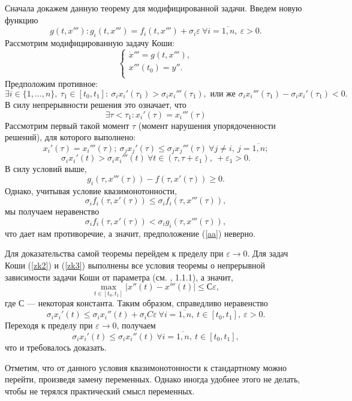 \documentclass{article}
\renewcommand{\le}{\leqslant}
\renewcommand{\ge}{\geqslant}
\newcommand{\abs}[1]{\left\lvert #1 \right\rvert}
\theoremstyle{definition}
\begin{document}
Сначала докажем данную теорему для модифицированной задачи.
Введем новую функцию
\[
g(t, x'''): g_i(t, x''') = f_i(t, x''') + \sigma_i \varepsilon \ \forall i = \overline{1, n},\ \varepsilon > 0.
\]
Рассмотрим модифицированную задачу Коши:
\begin{equation}
\begin{cases} \label{zk3}
	\dot x''' = g(t, x'''), \\
	x'''(t_0) = y''. \\
\end{cases}
\end{equation}
Предположим противное:
\begin{equation} \label{aa}
\exists i \in \{1,\dots,n\},\ \tau_1 \in [t_0, t_1]:\ \sigma_ix_i'(\tau_1) > \sigma_i x_i'''(\tau_1), \text{ или же } \sigma_i x_i'''(\tau_1) - \sigma_i x_i'(\tau_1) < 0.
\end{equation}
В силу непрерывности решения это означает, что
\[
	\exists \tau < \tau_1: x_i'(\tau) = x_i'''(\tau)
\]
Рассмотрим первый такой момент \(\tau\) (момент нарушения упорядоченности решений), для которого выполнено:
\[
	x_i'(\tau) = x_i'''(\tau);\ \sigma_j x_j'(\tau) \le \sigma_j x_j'''(\tau)\  \forall j \ne i,\ j = \overline{1,n};
\]
\[
	\sigma_i x_i'(t) > \sigma_i x_i'''(t)\ \forall t \in (\tau,\tau+\varepsilon_1),\ +\varepsilon_1 > 0.
\]
В силу условий выше,
\[
	g_i(\tau, x'''(\tau)) - f(\tau, x'(\tau)) \ge 0.
\]
Однако, учитывая условие квазимонотонности,
\[
	\sigma_i f_i(\tau, x'(\tau)) \le \sigma_i f_i(\tau,x'''(\tau)),
\]
мы получаем неравенство
\[
	\sigma_i f_i(\tau, x'(\tau)) < \sigma_i g_i(\tau,x'''(\tau)),
\]
что дает нам противоречие, а значит, предположение (\ref{aa}) неверно.

Для доказательства самой теоремы перейдем к пределу при \(\varepsilon \to 0\). Для задач Коши (\ref{zk2}) и (\ref{zk3}) выполнены все условия теоремы о непрерывной зависимости задачи Коши от параметра (см. \cite{6}, 1.1.1), а значит,
\[
	\max_{t \in [t_0, t_1]} \abs{x''(t) - x'''(t)} \le С\varepsilon,
\]
где \(С\) --- некоторая константа. Таким образом, справедливо неравенство
\[
	\sigma_i x_i'(t) \le \sigma_i x_i''(t) + \sigma_i C\varepsilon \ \forall i = \overline{1,n},\ t\in [t_0, t_1],\ \varepsilon > 0.
\]
Переходя к пределу при \(\varepsilon \to 0\), получаем
\[
\sigma_i x_i'(t) \le \sigma_i x_i''(t)\ \forall i = \overline{1,n},\ t\in [t_0, t_1],
\]
что и требовалось доказать.

Отметим, что от данного условия квазимонотонности к стандартному можно перейти, произведя замену переменных. Однако иногда удобнее этого не делать, чтобы не терялся практический смысл переменных.
\end{document}
